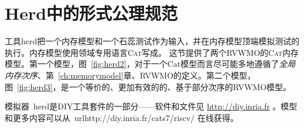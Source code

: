 \section{Herd中的形式公理规范}
\label{sec:herd}

工具\textsf{herd}把一个内存模型和一个石蕊测试作为输入，并在内存模型顶端模拟测试的执行。内存模型使用领域专用语言\textsc{Cat}写成。
这节提供了两个RVWMO的\textsc{Cat}内存模型。第一个模型，图~\ref{fig:herd2}，对于一个Cat模型而言尽可能多地遵循了\emph{全局内存次序}、第~\ref{ch:memorymodel}章、RVWMO的定义。第二个模型，图~\ref{fig:herd3}，是一个等价的、更加有效的的、基于部分次序的RVWMO模型。

模拟器~\textsf{herd}是\textsf{DIY}工具套件的一部分——软件和文件见 \url{http://diy.inria.fr} 。模型和更多内容可以从~url{http://diy.inria.fr/cats7/riscv/} 在线获得。

